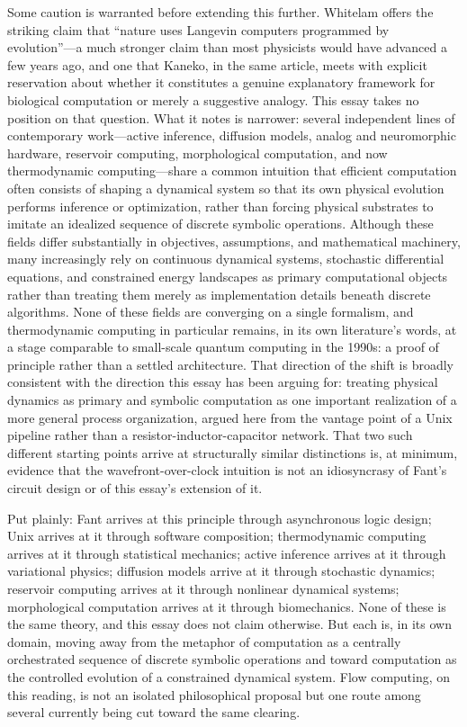 \documentclass[12pt, a4paper]{article}
\begin{document}
Some caution is warranted before extending this further.
Whitelam offers the striking claim that ``nature uses Langevin
computers programmed by evolution''---a much stronger claim than
most physicists would have advanced a few years ago, and one
that Kaneko, in the same article, meets with explicit reservation
about whether it constitutes a genuine explanatory framework for
biological computation or merely a suggestive analogy. This essay
takes no position on that question. What it notes is narrower:
several independent lines of contemporary work---active
inference, diffusion models, analog and neuromorphic hardware,
reservoir computing, morphological computation, and now
thermodynamic computing---share a common intuition that efficient
computation often consists of shaping a dynamical system so that
its own physical evolution performs inference or optimization,
rather than forcing physical substrates to imitate an idealized
sequence of discrete symbolic operations. Although these fields
differ substantially in objectives, assumptions, and mathematical
machinery, many increasingly rely on continuous dynamical
systems, stochastic differential equations, and constrained
energy landscapes as primary computational objects rather than
treating them merely as implementation details beneath discrete
algorithms. None of these fields
are converging on a single formalism, and thermodynamic computing
in particular remains, in its own literature's words, at a stage
comparable to small-scale quantum computing in the 1990s: a proof
of principle rather than a settled architecture. That direction
of the shift is broadly consistent with the direction this essay
has been arguing for: treating physical dynamics as primary and
symbolic computation as one important realization of a more
general process organization, argued here from the vantage point
of a Unix pipeline rather than a resistor-inductor-capacitor
network. That two such different starting points arrive at
structurally similar distinctions is, at minimum, evidence that
the wavefront-over-clock intuition is not an idiosyncrasy of
Fant's circuit design or of this essay's extension of it.

Put plainly: Fant arrives at this principle through asynchronous
logic design; Unix arrives at it through software composition;
thermodynamic computing arrives at it through statistical
mechanics; active inference arrives at it through variational
physics; diffusion models arrive at it through stochastic
dynamics; reservoir computing arrives at it through nonlinear
dynamical systems; morphological computation arrives at it
through biomechanics. None of these is the same theory, and this
essay does not claim otherwise. But each is, in its own domain,
moving away from the metaphor of computation as a centrally
orchestrated sequence of discrete symbolic operations and toward
computation as the controlled evolution of a constrained
dynamical system. Flow computing, on this reading, is not an
isolated philosophical proposal but one route among several
currently being cut toward the same clearing.
\end{document}
